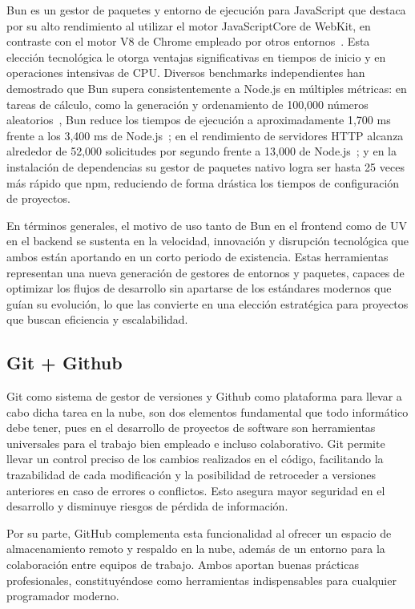 Bun es un gestor de paquetes y entorno de ejecución para JavaScript que destaca por su alto rendimiento al utilizar el motor JavaScriptCore de WebKit, en contraste con el motor V8 de Chrome empleado por otros entornos~\cite{strapi_bun_node_perf}. Esta elección tecnológica le otorga ventajas significativas en tiempos de inicio y en operaciones intensivas de CPU. Diversos benchmarks independientes han demostrado que Bun supera consistentemente a Node.js en múltiples métricas: en tareas de cálculo, como la generación y ordenamiento de 100,000 números aleatorios~\cite{dreamhost_bun_node}, Bun reduce los tiempos de ejecución a aproximadamente 1,700 ms frente a los 3,400 ms de Node.js~\cite{dreamhost_bun_node}; en el rendimiento de servidores HTTP alcanza alrededor de 52,000 solicitudes por segundo frente a 13,000 de Node.js~\cite{strapi_bun_node_perf}; y en la instalación de dependencias su gestor de paquetes nativo logra ser hasta 25 veces más rápido que npm, reduciendo de forma drástica los tiempos de configuración de proyectos.~\cite{keepcoding_bun}~\cite{milesweb_bun_npm}

En términos generales, el motivo de uso tanto de Bun en el frontend como de UV en el backend se sustenta en la velocidad, innovación y disrupción tecnológica que ambos están aportando en un corto periodo de existencia. Estas herramientas representan una nueva generación de gestores de entornos y paquetes, capaces de optimizar los flujos de desarrollo sin apartarse de los estándares modernos que guían su evolución, lo que las convierte en una elección estratégica para proyectos que buscan eficiencia y escalabilidad.

\subsection{Git + Github}

Git como sistema de gestor de versiones y Github como plataforma para llevar a cabo dicha tarea en la nube, son dos elementos fundamental que todo informático debe tener, pues en el desarrollo de proyectos de software son herramientas universales para el trabajo bien empleado e incluso colaborativo. Git permite llevar un control preciso de los cambios realizados en el código, facilitando la trazabilidad de cada modificación y la posibilidad de retroceder a versiones anteriores en caso de errores o conflictos. Esto asegura mayor seguridad en el desarrollo y disminuye riesgos de pérdida de información.~\cite{github_guides}

Por su parte, GitHub complementa esta funcionalidad al ofrecer un espacio de almacenamiento remoto y respaldo en la nube, además de un entorno para la colaboración entre equipos de trabajo. Ambos aportan buenas prácticas profesionales, constituyéndose como herramientas indispensables para cualquier programador moderno.

